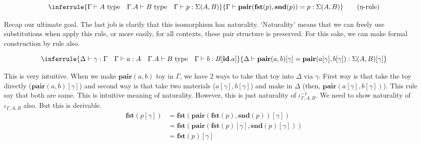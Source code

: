 \documentclass[12pt, a4paper, openany, twoside]{book}
\theoremstyle{definition}
\theoremstyle{remark}
\theoremstyle{plain}
\numberwithin{equation}{section}
\begin{document}
\begin{tcolorbox}[colback=yellow!10!white,colframe=green!75!black,title=Construction 2.2.4.]
\[
\inferrule
{
    \Gamma \vdash A \text{ type} \quad \Gamma.A \vdash B \text{ type} \quad \Gamma \vdash p : \Sigma(A, B)
}
{
    \Gamma \vdash \textbf{pair}(\textbf{fst}(p), \textbf{snd}(p)) = p : \Sigma(A, B)
}
\qquad \text{($\eta$-rule)}
\]
\end{tcolorbox}
Recap our ultimate goal. The last job is clarify that this isomorphism has naturality. \lq Naturality' means that 
we can freely use substitutions when apply this rule, or more easily, for all contexts, these pair structure is preserved. 
For this sake, we can make formal construction by rule also. 

\begin{tcolorbox}[colback=yellow!10!white,colframe=green!75!black,title=Construction 2.2.5.]
\[
\inferrule
{
    \Delta \vdash \gamma : \Gamma \quad \Gamma \vdash a : A \quad \Gamma.A \vdash B \text{ type} \quad \Gamma \vdash b : B[\textbf{id}.a]
}
{
    \Delta \vdash \textbf{pair}(a, b)[\gamma] = \textbf{pair}(a[\gamma], b[\gamma]) : \Sigma(A, B)[\gamma]
}
\]
\end{tcolorbox}
This is very intuitive. When we make $\textbf{pair}(a, b)$ toy in $\Gamma$, we have 2 ways to take that toy into $\Delta$ via $\gamma$. 
First way is that take the toy directly ($\textbf{pair}(a,b)[\gamma]$) and second way is that 
take two materials ($a[\gamma], b[\gamma]$) and make in $\Delta$ (then, $\textbf{pair}(a[\gamma], b[\gamma])$). This rule say that 
both are same. This is intuitive meaning of naturality. However, this is just naturality of $\iota_{\Gamma, A, B}^{-1}$. 
We need to show naturality of $\iota_{\Gamma, A, B}$ also. But this is derivable. 
\begin{align*}
    \textbf{fst}(p[\gamma]) &= \textbf{fst}(\textbf{pair}(\textbf{fst}(p), \textbf{snd}(p))[\gamma]) \\
    &= \textbf{fst}(\textbf{pair}(\textbf{fst}(p)[\gamma], \textbf{snd}(p)[\gamma])) \\
    &= \textbf{fst}(p)[\gamma]
\end{align*}
\end{document}
